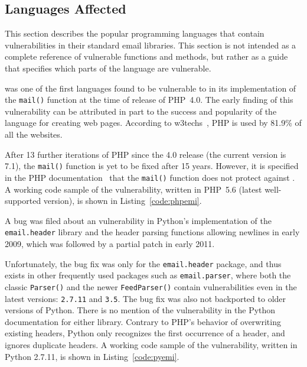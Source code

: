 \subsection{Languages Affected}
\label{languages}
This section describes the popular programming languages that contain \ehi vulnerabilities in their standard email libraries. This section is not intended as a complete reference of vulnerable functions and methods, but rather as a guide that specifies which parts of the language are vulnerable.

 was one of the first languages found to be vulnerable to \ehi in its implementation of the \texttt{mail()} function at the time of release of PHP~4.0. The early finding of this vulnerability can be attributed in part to the success and popularity of the language for creating web pages. According to w3techs~\cite{W3techs}, PHP is used by 81.9\% of all the websites.

After 13 further iterations of PHP since the 4.0 release (the current version is 7.1), the \texttt{mail()} function is yet to be fixed after 15 years. However, it is specified in the PHP documentation~\cite{PHPDocs} that the \texttt{mail()} function does not protect against \ehi.
A working code sample of the vulnerability, written in PHP~5.6 (latest well-supported version), is shown in  Listing~\ref{code:phpemi}.

\begin{sloppypar}
A bug was filed about an \ehi vulnerability in Python's implementation of the \texttt{email.header} library and the header parsing functions allowing newlines in early 2009, which was followed by a partial patch in early 2011.
\end{sloppypar}

Unfortunately, the bug fix was only for the \texttt{email.header} package, and thus exists in other frequently used packages such as \texttt{email.parser}, where both the classic \texttt{Parser()} and the newer \texttt{FeedParser()} contain \ehi vulnerabilities even in the latest versions: \texttt{2.7.11} and \texttt{3.5}. The bug fix was also not backported to older versions of Python.
There is no mention of the vulnerability in the Python documentation for either library. Contrary to PHP's behavior of overwriting existing headers, Python only recognizes the first occurrence of a header, and ignores duplicate headers.
A working code sample of the vulnerability, written in Python 2.7.11, is shown in Listing~\ref{code:pyemi}.


